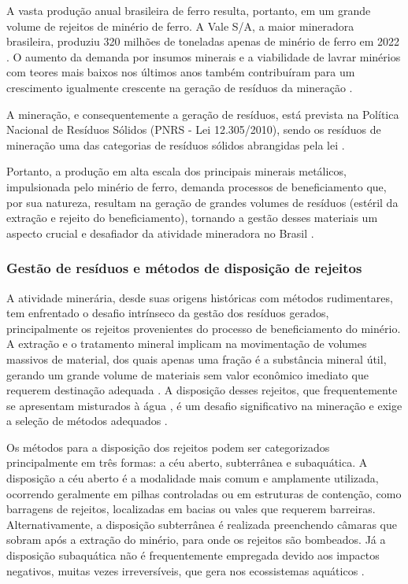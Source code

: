 A vasta produção anual brasileira de ferro resulta, portanto, em um grande volume de rejeitos de minério de ferro. A Vale S/A, a maior mineradora brasileira, produziu 320 milhões de toneladas apenas de minério de ferro em 2022 \cite{pmb2023}. O aumento da demanda por insumos minerais e a viabilidade de lavrar minérios com teores mais baixos nos últimos anos também contribuíram para um crescimento igualmente crescente na geração de resíduos da mineração \cite{ibram2016}.

A mineração, e consequentemente a geração de resíduos, está prevista na Política Nacional de Resíduos Sólidos (PNRS - Lei 12.305/2010), sendo os resíduos de mineração uma das categorias de resíduos sólidos abrangidas pela lei \cite{freire2020}.

Portanto, a produção em alta escala dos principais minerais metálicos, impulsionada pelo minério de ferro, demanda processos de beneficiamento que, por sua natureza, resultam na geração de grandes volumes de resíduos (estéril da extração e rejeito do beneficiamento), tornando a gestão desses materiais um aspecto crucial e desafiador da atividade mineradora no Brasil \cite{freire2020}.

\subsubsection{Gestão de resíduos e métodos de disposição de rejeitos}

A atividade minerária, desde suas origens históricas com métodos rudimentares, tem enfrentado o desafio intrínseco da gestão dos resíduos gerados, principalmente os rejeitos provenientes do processo de beneficiamento do minério. A extração e o tratamento mineral implicam na movimentação de volumes massivos de material, dos quais apenas uma fração é a substância mineral útil, gerando um grande volume de materiais sem valor econômico imediato que requerem destinação adequada \cite{freire2020}. A disposição desses rejeitos, que frequentemente se apresentam misturados à água \cite{lozano2006}, é um desafio significativo na mineração e exige a seleção de métodos adequados \cite{cardozo2017}.

Os métodos para a disposição dos rejeitos podem ser categorizados principalmente em três formas: a céu aberto, subterrânea e subaquática. A disposição a céu aberto é a modalidade mais comum e amplamente utilizada, ocorrendo geralmente em pilhas controladas ou em estruturas de contenção, como barragens de rejeitos, localizadas em bacias ou vales que requerem barreiras. Alternativamente, a disposição subterrânea é realizada preenchendo câmaras que sobram após a extração do minério, para onde os rejeitos são bombeados. Já a disposição subaquática não é frequentemente empregada devido aos impactos negativos, muitas vezes irreversíveis, que gera nos ecossistemas aquáticos \cite{lozano2006}.

